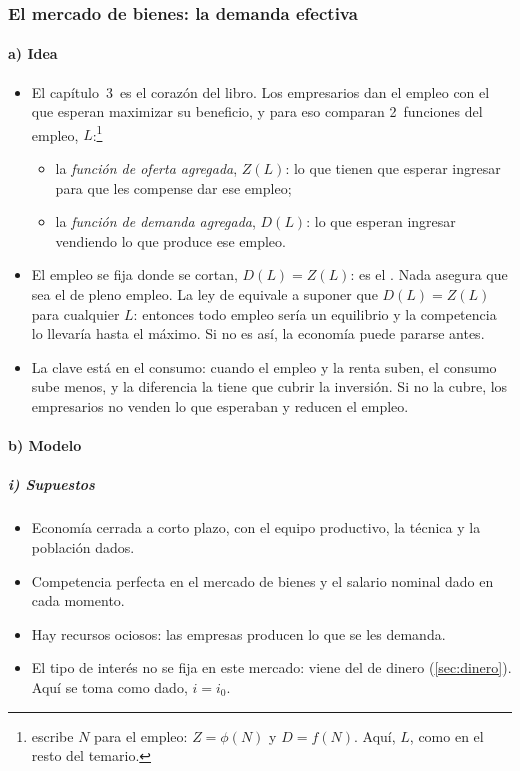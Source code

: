 \documentclass[11pt]{article}
\begin{document}
\subsubsection{El mercado de bienes: la demanda efectiva}\label{sec:bienes}

\paragraph{a) Idea}

\begin{itemize}
\item El capítulo~3~es el corazón del libro. Los empresarios dan el empleo con el que esperan maximizar su beneficio, y para eso comparan 2~funciones del empleo, $L$\nocite{Keynes1936}:\footnote{ escribe $N$ para el empleo: $Z=\phi(N)$ y $D=f(N)$. Aquí, $L$, como en el resto del temario.}
  \begin{itemize}
  \item la \emph{función de oferta agregada}, $Z(L)$: lo que tienen que esperar ingresar para que les compense dar ese empleo;
  \item la \emph{función de demanda agregada}, $D(L)$: lo que esperan ingresar vendiendo lo que produce ese empleo.
  \end{itemize}
\item El empleo se fija donde se cortan, $D(L)=Z(L)$: es el . Nada asegura que sea el de pleno empleo. La ley de  equivale a suponer que $D(L)=Z(L)$ para cualquier $L$: entonces todo empleo sería un equilibrio y la competencia lo llevaría hasta el máximo. Si no es así, la economía puede pararse antes.
\item La clave está en el consumo: cuando el empleo y la renta suben, el consumo sube menos, y la diferencia la tiene que cubrir la inversión. Si no la cubre, los empresarios no venden lo que esperaban y reducen el empleo.
\end{itemize}

\paragraph{b) Modelo}

\subparagraph{i) Supuestos}

\begin{itemize}
\item Economía cerrada a corto plazo, con el equipo productivo, la técnica y la población dados.
\item Competencia perfecta en el mercado de bienes y el salario nominal dado en cada momento.
\item Hay recursos ociosos: las empresas producen lo que se les demanda.
\item El tipo de interés no se fija en este mercado: viene del de dinero (\ref{sec:dinero}). Aquí se toma como dado, $i=i_0$.
\end{itemize}
\end{document}
